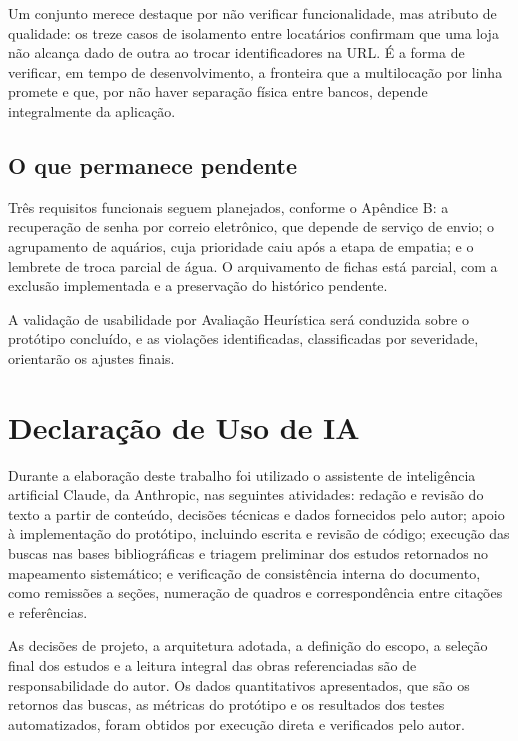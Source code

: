 \documentclass[12pt,oneside,a4paper,brazilian]{abntex2}
\begin{document}
Um conjunto merece destaque por não verificar funcionalidade, mas atributo de qualidade: os treze casos de isolamento entre locatários confirmam que uma loja não alcança dado de outra ao trocar identificadores na URL. É a forma de verificar, em tempo de desenvolvimento, a fronteira que a multilocação por linha promete e que, por não haver separação física entre bancos, depende integralmente da aplicação.


\subsection{O que permanece pendente}
Três requisitos funcionais seguem planejados, conforme o Apêndice B: a recuperação de senha por correio eletrônico, que depende de serviço de envio; o agrupamento de aquários, cuja prioridade caiu após a etapa de empatia; e o lembrete de troca parcial de água. O arquivamento de fichas está parcial, com a exclusão implementada e a preservação do histórico pendente.

A validação de usabilidade por Avaliação Heurística será conduzida sobre o protótipo concluído, e as violações identificadas, classificadas por severidade, orientarão os ajustes finais.



\section*{Declara\c{c}\~ao de Uso de IA}

Durante a elabora\c{c}\~ao deste trabalho foi utilizado o assistente de intelig\^encia
artificial Claude, da Anthropic, nas seguintes atividades: reda\c{c}\~ao e revis\~ao
do texto a partir de conte\'udo, decis\~oes t\'ecnicas e dados fornecidos pelo autor;
apoio \`a implementa\c{c}\~ao do prot\'otipo, incluindo escrita e revis\~ao de c\'odigo;
execu\c{c}\~ao das buscas nas bases bibliogr\'aficas e triagem preliminar dos estudos
retornados no mapeamento sistem\'atico; e verifica\c{c}\~ao de consist\^encia interna
do documento, como remiss\~oes a se\c{c}\~oes, numera\c{c}\~ao de quadros e
correspond\^encia entre cita\c{c}\~oes e refer\^encias.

As decis\~oes de projeto, a arquitetura adotada, a defini\c{c}\~ao do escopo, a
sele\c{c}\~ao final dos estudos e a leitura integral das obras referenciadas s\~ao de
responsabilidade do autor. Os dados quantitativos apresentados, que s\~ao os retornos das buscas,
as m\'etricas do prot\'otipo e os resultados dos testes automatizados, foram obtidos
por execu\c{c}\~ao direta e verificados pelo autor.
\end{document}

